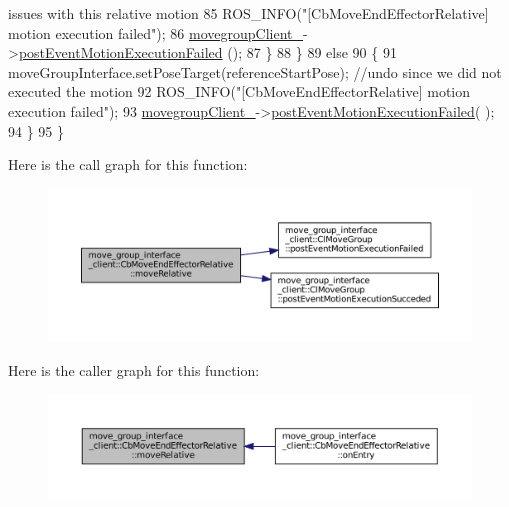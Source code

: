 \begin{DoxyCode}
{       issues with this relative motion}
85                 ROS\_INFO(\textcolor{stringliteral}{"[CbMoveEndEffectorRelative] motion execution failed"});
86                 \hyperlink{classmove__group__interface__client_1_1CbMoveEndEffectorRelative_a979ec9c309b1b52a0d0e254b49865fdc}{movegroupClient\_}->\hyperlink{classmove__group__interface__client_1_1ClMoveGroup_a41c0eebdb446e6fbdd17113524c34869}{postEventMotionExecutionFailed}
      ();
87             \}
88         \}
89         \textcolor{keywordflow}{else}
90         \{
91             moveGroupInterface.setPoseTarget(referenceStartPose); \textcolor{comment}{//undo since we did not executed the
       motion}
92             ROS\_INFO(\textcolor{stringliteral}{"[CbMoveEndEffectorRelative] motion execution failed"});
93             \hyperlink{classmove__group__interface__client_1_1CbMoveEndEffectorRelative_a979ec9c309b1b52a0d0e254b49865fdc}{movegroupClient\_}->\hyperlink{classmove__group__interface__client_1_1ClMoveGroup_a41c0eebdb446e6fbdd17113524c34869}{postEventMotionExecutionFailed}(
      );
94         \}
95     \}
\end{DoxyCode}
Here is the call graph for this function\+:
\nopagebreak
\begin{figure}[H]
\begin{center}
\leavevmode
\includegraphics[width=350pt]{classmove__group__interface__client_1_1CbMoveEndEffectorRelative_a8f64d14c4a398b455b1953ae61cc58bc_cgraph}
\end{center}
\end{figure}
Here is the caller graph for this function\+:
\nopagebreak
\begin{figure}[H]
\begin{center}
\leavevmode
\includegraphics[width=350pt]{classmove__group__interface__client_1_1CbMoveEndEffectorRelative_a8f64d14c4a398b455b1953ae61cc58bc_icgraph}
\end{center}
\end{figure}
